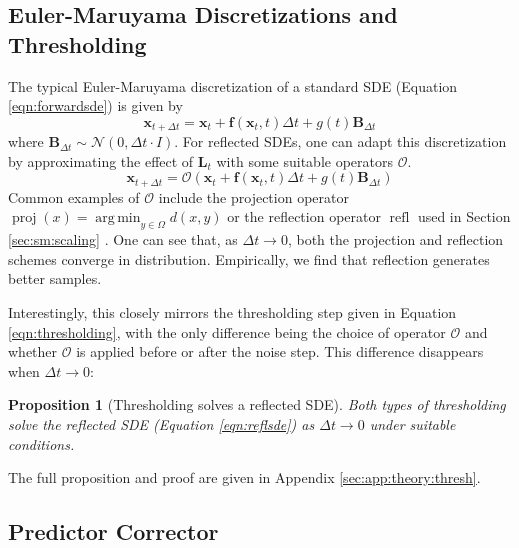 \documentclass{article}
\theoremstyle{plain}
\newtheorem{proposition}[theorem]{Proposition}
\theoremstyle{definition}
\theoremstyle{remark}
\DeclareMathOperator*{\argmin}{arg\,min}
\DeclareMathOperator{\proj}{proj}
\DeclareMathOperator{\refl}{refl}
\renewcommand{\vec}{\mathbf}
\begin{document}
\subsection{Euler-Maruyama Discretizations and Thresholding}

The typical Euler-Maruyama discretization of a standard SDE (Equation \ref{eqn:forwardsde}) is given by
\begin{equation}\label{eqn:euma}
    \vec{x}_{t + \Delta t} = \vec{x}_t + \vec{f}(\vec{x}_t, t) \Delta t + g(t) \vec{B}_{\Delta t}
\end{equation}
where $\vec{B}_{\Delta t} \sim \mathcal{N}(0, \Delta t \cdot I)$. For reflected SDEs, one can adapt this discretization by approximating the effect of $\vec{L}_t$ with some suitable operators $\mathcal{O}$.
\begin{equation}\label{eqn:refleuma_proj}
    \vec{x}_{t + \Delta t} = \mathcal{O}(\vec{x}_t + \vec{f}(\vec{x}_t, t) \Delta t + g(t) \vec{B}_{\Delta t})
\end{equation}
Common examples of $\mathcal{O}$ include the projection operator $\proj(x) = \argmin_{y \in \Omega} d(x, y)$ \citep{Liu1993NumericalAT} or the reflection operator $\refl$ used in Section \ref{sec:sm:scaling} \citep{Schuss2013BrownianDA}. One can see that, as $\Delta t \to 0$, both the projection and reflection schemes converge in distribution. Empirically, we find that reflection generates better samples.

Interestingly, this closely mirrors the thresholding step given in Equation \ref{eqn:thresholding}, with the only difference being the choice of operator $\mathcal{O}$ and whether $\mathcal{O}$ is applied before or after the noise step. This difference disappears when $\Delta t \to 0$:
\begin{proposition}[Thresholding solves a reflected SDE]
    Both types of thresholding solve the reflected SDE (Equation \ref{eqn:reflsde}) as $\Delta t \to 0$ under suitable conditions.
\end{proposition}
The full proposition and proof are given in Appendix \ref{sec:app:theory:thresh}.

\subsection{Predictor Corrector}
\end{document}
